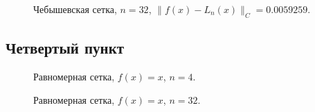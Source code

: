\documentclass[12pt, a4paper]{article}
\begin{document}
\begin{figure}[h]
    \caption{Чебышевская сетка, $n = 32$, $ \| f(x) - L_n(x)  \|_C = 0.0059259 $.}
\end{figure}

\pagebreak


\subsection{Четвертый пункт}

\begin{figure}[h]
    \caption{Равномерная сетка, $f(x) = x$, $n = 4$.}
\end{figure}

\begin{figure}[h]
    \caption{Равномерная сетка, $f(x) = x$, $n = 32$.}
\end{figure}
\end{document}
